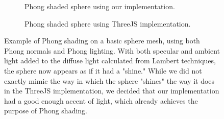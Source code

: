 \documentclass[10pt,twocolumn,letterpaper]{article}
\begin{document}
\begin{figure}
    \centering
    \begin{subfigure}{.48\linewidth}
        \caption{Phong shaded sphere using our implementation.}
        \label{fig:our-phong-sphere}
    \end{subfigure}
    \hfill
    \begin{subfigure}{.48\linewidth}
        \caption{Phong shaded sphere using ThreeJS implementation.}
        \label{fig:three-phong-sphere}
    \end{subfigure}
    \caption{Example of Phong shading on a basic sphere mesh, using both Phong normals and Phong lighting. With both specular and ambient light added to the diffuse light calculated from Lambert techniques, the sphere now appears as if it had a "shine." While we did not exactly mimic the way in which the sphere "shines" the way it does in the ThreeJS implementation, we decided that our implementation had a good enough accent of light, which already achieves the purpose of Phong shading.}
    \label{fig:phong-sphere}
\end{figure}
\end{document}
